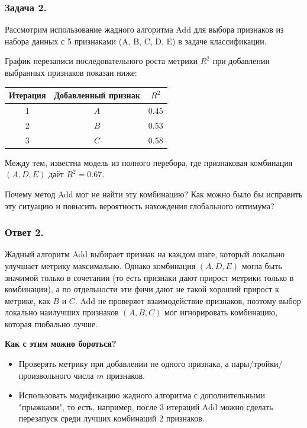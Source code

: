 \subsubsection{Задача 2.}

Рассмотрим использование жадного алгоритма Add для выбора признаков из набора данных с 5 признаками ({A, B, C, D, E}) в задаче классификации.

График перезаписи последовательного роста метрики $R^2$ при добавлении выбранных признаков показан ниже:

\begin{table}[h!]
\centering
\begin{tabular}{|c|c|c|}
\hline
\textbf{Итерация} & \textbf{Добавленный признак} & \boldmath${R^2}$ \\ \hline
1                 & $A$                       & 0.45             \\ \hline
2                 & $B$                       & 0.53             \\ \hline
3                 & $C$                       & 0.58             \\ \hline
\end{tabular}
\end{table}

Между тем, известна модель из полного перебора, где признаковая комбинация $({A, D, E})$ даёт $R^2 = 0.67$.

Почему метод Add мог не найти эту комбинацию? Как можно было бы исправить эту ситуацию и повысить вероятность нахождения глобального оптимума?

\subsubsection{Ответ 2.}

Жадный алгоритм Add выбирает признак на каждом шаге, который локально улучшает метрику максимально. Однако комбинация $({A, D, E})$ могла быть значимой только в сочетании (то есть признаки дают прирост метрики только в комбинации), а по отдельности эти фичи дают не такой хороший прирост к метрике, как $B$ и $C$. Add не проверяет взаимодействие признаков, поэтому выбор локально наилучших признаков $({A, B, C})$ мог игнорировать комбинацию, которая глобально лучше.

\textbf{Как с этим можно бороться?}
\begin{itemize}
    \item Проверять метрику при добавлении не одного признака, а пары/тройки/произвольного числа $m$ признаков.
    \item Использовать модификацию жадного алгоритма с дополнительными "прыжками", то есть, например, после 3 итераций Add можно сделать перезапуск среди лучших комбинаций 2 признаков.
\end{itemize}

